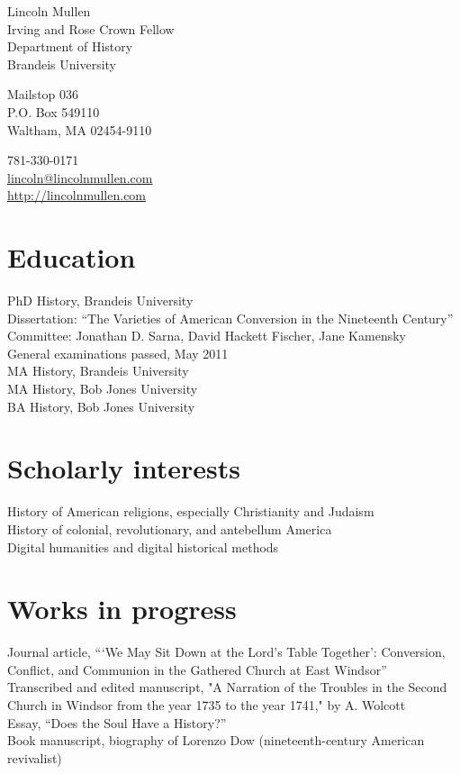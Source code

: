 \documentclass[11pt, a4paper]{article}
\newcommand{\years}[1]{\marginnote{\scriptsize #1}}
\begin{document}
{\LARGE Lincoln Mullen}\\[1cm]

Irving and Rose Crown Fellow\\
Department of History\\
Brandeis University

\begin{multicols}{2}
Mailstop 036\\
P.O. Box 549110\\
Waltham, MA 02454-9110

\columnbreak

781-330-0171\\
\href{mailto:lincoln@lincolnmullen.com}{lincoln@lincolnmullen.com}\\
\href{http://lincolnmullen.com}{http://lincolnmullen.com}
\end{multicols}


\vfill


\section*{Education}
\noindent
\years{2009--}PhD History, Brandeis University\\[.05cm]
	Dissertation: ``The Varieties of American Conversion in the Nineteenth Century''\\
	Committee:  Jonathan D. Sarna, David Hackett Fischer, Jane Kamensky\\
	General examinations passed, May 2011\\[.2cm]
\years{2011}MA History, Brandeis University\\
\years{2008}MA History, Bob Jones University\\
\years{2006}BA History, Bob Jones University

\section*{Scholarly interests}
History of American religions, especially Christianity and Judaism\\
History of colonial, revolutionary, and antebellum America\\
Digital humanities and digital historical methods

\section*{Works in progress}
Journal article, ```We May Sit Down at the Lord's Table Together': Conversion,  Conflict, and Communion in the Gathered Church at East Windsor''\\[.05cm]
Transcribed and edited manuscript, "A Narration of the Troubles in the Second Church in Windsor from the year 1735 to the year 1741," by A. Wolcott\\[.05cm]
Essay, ``Does the Soul Have a History?''\\[.05cm]
Book manuscript, biography of Lorenzo Dow (nineteenth-century American revivalist)
\end{document}
